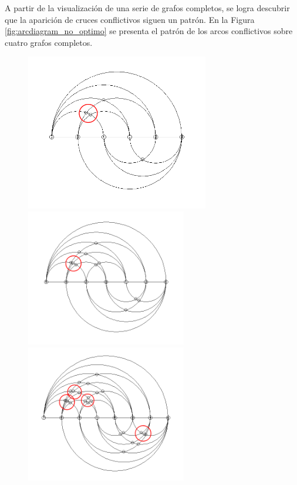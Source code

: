 	
	A partir de la visualización de  una serie de grafos completos, se logra descubrir  que la aparición de cruces conflictivos  siguen un  patrón. En la Figura \ref{fig:arcdiagram_no_optimo} se presenta el patrón de los  arcos  conflictivos sobre cuatro grafos completos. 
	
	
	\begin{figure}
		\centering
		\includegraphics[width=8cm]{imagenes/grafo_1_bn_no_opt.png}
		\includegraphics[width=7cm]{imagenes/grafo_2_bn_no_opt.png}\\
		\includegraphics[width=7cm]{imagenes/grafo_3_bn_no_opt.png}

\end{figure}
